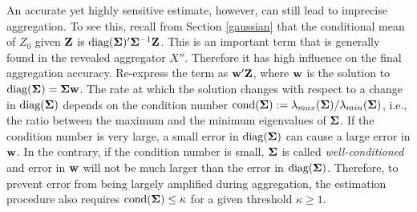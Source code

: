 \documentclass[11pt]{article}
\theoremstyle{definition}
\theoremstyle{definition}
\def\bSigma{{\bf \Sigma}}
\def\w{{\bf w}}
\def\Z{{\bf Z}}
\def\cond{\text{cond}}
\def\diag{\text{diag}}
\def\diag{\text{diag}}
\begin{document}
An accurate yet highly sensitive estimate, however, can still lead to imprecise aggregation. To see this, recall from Section \ref{gaussian} that the conditional mean of $Z_0$ given $\Z$ is  $\diag(\bSigma)' \bSigma^{-1} \Z$. This is an important term that is generally found in the revealed aggregator $X''$. Therefore it has high influence on the final aggregation accuracy. 
 Re-express the term as $\w' \Z$, where $\w$ is the solution to $\diag(\bSigma) = \bSigma \w$. The rate at which the solution changes with respect to a change in $\diag(\bSigma)$ depends on the condition number $\cond(\bSigma) := \lambda_{max}(\bSigma) / \lambda_{min}(\bSigma)$, i.e., the ratio between the maximum and the minimum eigenvalues of $\bSigma$. If the condition number is very large, a small error in $\diag(\bSigma)$ can cause a large error in $\w$. In the contrary, if the condition number is small, $\bSigma$ is called \textit{well-conditioned} and error in $\w$ will not be much larger than the error in $\diag(\bSigma)$. Therefore, to prevent error from being largely amplified during aggregation, the estimation procedure also requires $\cond(\bSigma) \leq \kappa$ for a given threshold $\kappa \geq 1$. 
 
% 


\end{document}
